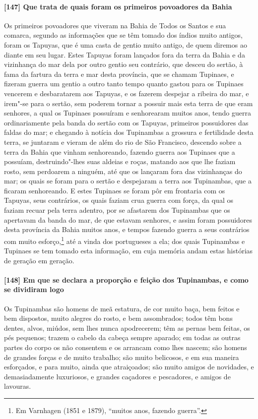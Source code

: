 \begin{linenumbers}
\paragraph{[147] Que trata de quais foram os primeiros povoadores da Bahia}\quad
Os primeiros povoadores que viveram na Bahia de Todos os Santos e sua comarca, segundo as
informações que se têm tomado dos índios muito antigos, foram os Tapuyas, que é uma casta
de gentio muito antigo, de quem diremos ao diante em seu lugar. Estes Tapuyas foram
lançados fora da terra da Bahia e da vizinhança do mar dela por outro gentio seu
contrário, que desceu do sertão, à fama da fartura da terra e mar desta província, que se
chamam Tupinaes, e fizeram guerra um gentio a outro tanto tempo quanto gastou para os
Tupinaes vencerem e desbaratarem aos Tapuyas, e os fazerem despejar a ribeira do mar, e
irem"-se para o sertão, sem poderem tornar a possuir mais esta terra de que eram senhores,
a qual os Tupinaes possuíram e senhorearam muitos anos, tendo guerra ordinariamente pela
banda do sertão com os Tapuyas, primeiros possuidores das faldas do mar; e chegando à
notícia dos Tupinambas a grossura e fertilidade desta terra, se juntaram e vieram de além
do rio de São Francisco, descendo sobre a terra da Bahia que vinham senhoreando, fazendo
guerra aos Tupinaes que a possuíam, destruindo"-lhes suas aldeias e roças, matando aos que
lhe faziam rosto, sem perdoarem a ninguém, até que os lançaram fora das vizinhanças do
mar; os quais se foram para o sertão e despejaram a terra aos Tupinambas, que a ficaram
senhoreando. E estes Tupinaes se foram pôr em frontaria com os Tapuyas, seus contrários,
os quais faziam crua guerra com força, da qual os faziam recuar pela terra adentro, por se
afastarem dos Tupinambas que os apertavam da banda do mar, de que estavam senhores, e
assim foram possuidores desta província da Bahia muitos anos, e tempos fazendo guerra a
seus contrários com muito esforço,\footnote{ Em Varnhagen (1851 e 1879), ``muitos anos,
fazendo guerra''.} até a vinda dos portugueses a ela; dos quais Tupinambas e Tupinaes se
tem tomado esta informação, em cuja memória andam estas histórias de geração em geração.

\paragraph{[148] Em que se declara a proporção e feição dos Tupinambas, e como se dividiram
logo}\quad
Os Tupinambas são homens de meã estatura, de cor muito baça, bem feitos e bem dispostos,
muito alegres do rosto, e bem assombrados; todos têm bons dentes, alvos, miúdos, sem lhes
nunca apodrecerem; têm as pernas bem feitas, os pés pequenos; trazem o cabelo da cabeça
sempre aparado; em todas as outras partes do corpo os não consentem e os arrancam como
lhes nascem; são homens de grandes forças e de muito trabalho; são muito belicosos, e em
sua maneira esforçados, e para muito, ainda que atraiçoados; são muito amigos de
novidades, e demasiadamente luxuriosos, e grandes caçadores e pescadores, e amigos de
lavouras.


\end{linenumbers}

